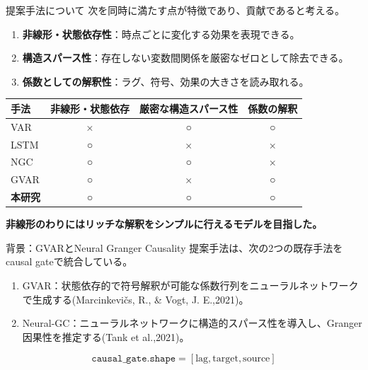 \documentclass[dvipdfmx,11pt]{beamer}
\begin{document}
\begin{frame}{提案手法について}
  \small
  次を同時に満たす点が特徴であり、貢献であると考える。

  \vspace{0.4em}
  \begin{enumerate}
    \item \textbf{非線形・状態依存性}：時点ごとに変化する効果を表現できる。
    \item \textbf{構造スパース性}：存在しない変数間関係を厳密なゼロとして除去できる。
    \item \textbf{係数としての解釈性}：ラグ、符号、効果の大きさを読み取れる。
  \end{enumerate}

  \vspace{0.5em}
  \scriptsize
  \setlength{\tabcolsep}{4pt}
  \renewcommand{\arraystretch}{1.25}
  \center
  \begin{tabular}{@{}lccc@{}}
    \toprule
    手法 & 非線形・状態依存 & 厳密な構造スパース性 & 係数の解釈 \\
    \midrule
    VAR & × & ○ & ○ \\
    LSTM & ○ & × & × \\
    NGC & ○ & ○ & ×\\
    GVAR & ○ & × & ○ \\
    \textbf{本研究} & \textbf{○} & \textbf{○} & \textbf{○} \\
    \bottomrule
  \end{tabular}

  \vspace{0.6em}
  \normalsize
\textbf{非線形のわりにはリッチな解釈をシンプルに行えるモデルを目指した。}
\end{frame}


\begin{frame}{背景：GVARとNeural Granger Causality}
  提案手法は、次の2つの既存手法をcausal gateで統合している。

  \begin{enumerate}
    \item GVAR：状態依存的で符号解釈が可能な係数行列をニューラルネットワークで生成する(Marcinkevičs, R., \& Vogt, J. E.,2021)。
    \item Neural-GC：ニューラルネットワークに構造的スパース性を導入し、Granger因果性を推定する(Tank et al.,2021)。
  \end{enumerate}

  \vspace{0.5em}

  \[
    \texttt{causal\_gate.shape} = [\text{lag}, \text{target}, \text{source}]
  \]
\end{frame}
\end{document}
